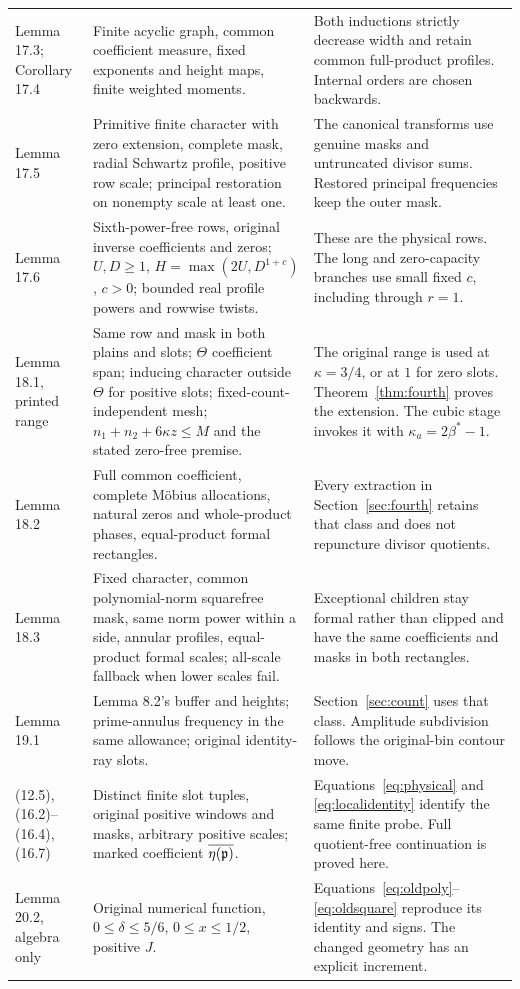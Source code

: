 \begin{longtable}{@{}>{\raggedright\arraybackslash}p{}>{\raggedright\arraybackslash}p{}>{\raggedright\arraybackslash}p{}@{}}
Lemma 17.3; Corollary 17.4&Finite acyclic graph, common coefficient measure, fixed exponents and height maps, finite weighted moments.&Both inductions strictly decrease width and retain common full-product profiles. Internal orders are chosen backwards.\\
Lemma 17.5&Primitive finite character with zero extension, complete mask, radial Schwartz profile, positive row scale; principal restoration on nonempty scale at least one.&The canonical transforms use genuine masks and untruncated divisor sums. Restored principal frequencies keep the outer mask.\\
Lemma 17.6&Sixth-power-free rows, original inverse coefficients and zeros; $U,D\ge1$, $H=\max(2U,D^{1+c})$, $c>0$; bounded real profile powers and rowwise twists.&These are the physical rows. The long and zero-capacity branches use small fixed $c$, including through $r=1$.\\
Lemma 18.1, printed range&Same row and mask in both plains and slots; $\Theta$ coefficient span; inducing character outside $\Theta$ for positive slots; fixed-count-independent mesh; $n_1+n_2+6\kappa z\le M$ and the stated zero-free premise.&The original range is used at $\kappa=3/4$, or at $1$ for zero slots. Theorem~\ref{thm:fourth} proves the extension. The cubic stage invokes it with $\kappa_a=2\beta^*-1$.\\
Lemma 18.2&Full common coefficient, complete Möbius allocations, natural zeros and whole-product phases, equal-product formal rectangles.&Every extraction in Section~\ref{sec:fourth} retains that class and does not repuncture divisor quotients.\\
Lemma 18.3&Fixed character, common polynomial-norm squarefree mask, same norm power within a side, annular profiles, equal-product formal scales; all-scale fallback when lower scales fail.&Exceptional children stay formal rather than clipped and have the same coefficients and masks in both rectangles.\\
Lemma 19.1&Lemma 8.2's buffer and heights; prime-annulus frequency in the same allowance; original identity-ray slots.&Section~\ref{sec:count} uses that class. Amplitude subdivision follows the original-bin contour move.\\
(12.5), (16.2)--(16.4), (16.7)&Distinct finite slot tuples, original positive windows and masks, arbitrary positive scales; marked coefficient $\overline{\eta(\mathfrak p)}$.&Equations~\eqref{eq:physical} and \eqref{eq:localidentity} identify the same finite probe. Full quotient-free continuation is proved here.\\
Lemma 20.2, algebra only&Original numerical function, $0\le\delta\le5/6$, $0\le x\le1/2$, positive $J$.&Equations~\eqref{eq:oldpoly}--\eqref{eq:oldsquare} reproduce its identity and signs. The changed geometry has an explicit increment.\\
\end{longtable}
\normalsize
